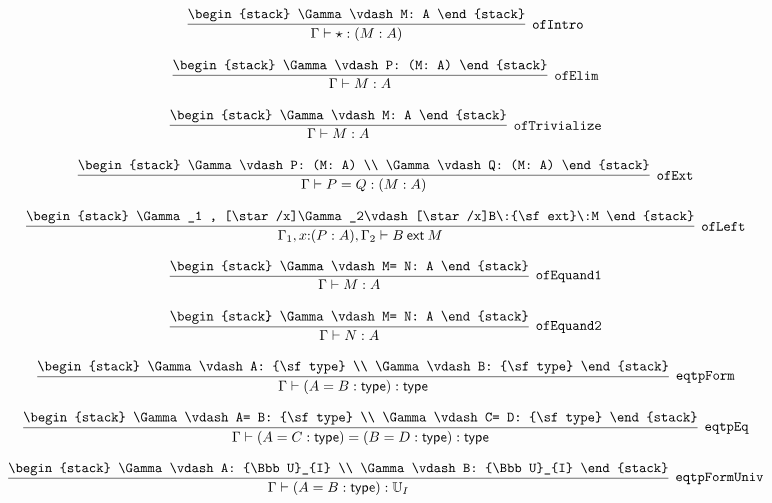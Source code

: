 \[
\infer[{\tt ofIntro}]{\Gamma \vdash \star : (M: A)}{
\begin{stack}
\Gamma \vdash M: A
\end{stack}}
\]

\[
\infer[{\tt ofElim}]{\Gamma \vdash M: A}{
\begin{stack}
\Gamma \vdash P: (M: A)
\end{stack}}
\]

\[
\infer[{\tt ofTrivialize}]{\Gamma \vdash M: A}{
\begin{stack}
\Gamma \vdash M: A
\end{stack}}
\]

\[
\infer[{\tt ofExt}]{\Gamma \vdash P= Q: (M: A)}{
\begin{stack}
\Gamma \vdash P: (M: A)
\\
\Gamma \vdash Q: (M: A)
\end{stack}}
\]

\[
\infer[{\tt ofLeft}]{\Gamma_1 ,x\mathord{:}(P: A), \Gamma_2 \vdash B\:{\sf ext}\:M}{
\begin{stack}
\Gamma_1 , [\star /x]\Gamma_2\vdash [\star /x]B\:{\sf ext}\:M
\end{stack}}
\]

\[
\infer[{\tt ofEquand1}]{\Gamma \vdash M: A}{
\begin{stack}
\Gamma \vdash M= N: A
\end{stack}}
\]

\[
\infer[{\tt ofEquand2}]{\Gamma \vdash N: A}{
\begin{stack}
\Gamma \vdash M= N: A
\end{stack}}
\]

\[
\infer[{\tt eqtpForm}]{\Gamma \vdash (A= B: {\sf type}): {\sf type}}{
\begin{stack}
\Gamma \vdash A: {\sf type}
\\
\Gamma \vdash B: {\sf type}
\end{stack}}
\]

\[
\infer[{\tt eqtpEq}]{\Gamma \vdash (A= C: {\sf type})= (B= D: {\sf type}): {\sf type}}{
\begin{stack}
\Gamma \vdash A= B: {\sf type}
\\
\Gamma \vdash C= D: {\sf type}
\end{stack}}
\]

\[
\infer[{\tt eqtpFormUniv}]{\Gamma \vdash (A= B: {\sf type}): {\Bbb U}_{I}}{
\begin{stack}
\Gamma \vdash A: {\Bbb U}_{I}
\\
\Gamma \vdash B: {\Bbb U}_{I}
\end{stack}}
\]

